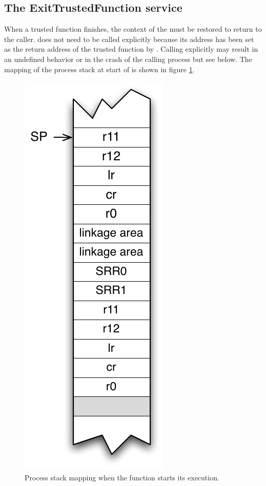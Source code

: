 \subsection{The ExitTrustedFunction service}\label{sec:exittfppc}

When a trusted function finishes, the context of the  must be restored to return to the caller.  does not need to be called explicitly because its address has been set as the return address of the trusted function by . Calling  explicitly may result in an undefined behavior or in the crash of the calling process but see below. The mapping of the process stack at start of  is shown in figure \ref{fig:ETFstack1}.

\begin{figure}[htbp] %
\begin{minipage}{0.4\textwidth}
    \centering
  \includegraphics[scale=.6]{pictures/ETFStack1} 
\end{minipage}
\begin{minipage}{0.6\textwidth}
  \caption{Process stack mapping when the  function starts its execution.}\label{fig:ETFstack1}
\end{minipage}
\end{figure}

